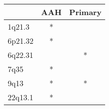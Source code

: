 \begin{tabular}{lcc}
\toprule
{} & AAH & Primary \\
\midrule
1q21.3  &   * &         \\
6p21.32 &   * &         \\
6q22.31 &     &       * \\
7q35    &   * &         \\
9q13    &   * &       * \\
22q13.1 &   * &         \\
\bottomrule
\end{tabular}
